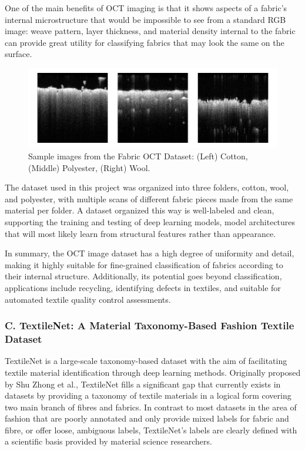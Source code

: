 One of the main benefits of OCT imaging is that it shows aspects of a fabric’s internal microstructure that would be impossible to see from a standard RGB image: weave pattern, layer thickness, and material density internal to the fabric can provide great utility for classifying fabrics that may look the same on the surface. 

\begin{figure}[H]
    \centering
    \begin{minipage}{0.8\linewidth}
        \includegraphics[width=\linewidth]{images/FabricOCTDataset.png}
    \end{minipage}
    \caption[Sample images from the Fabric OCT Dataset]{Sample images from the Fabric OCT Dataset: (Left) Cotton, (Middle) Polyester, (Right) Wool.}
\end{figure}

The dataset used in this project was organized into three folders, cotton, wool, and polyester, with multiple scans of different fabric pieces made from the same material per folder. A dataset organized this way is well-labeled and clean, supporting the training and testing of deep learning models, model architectures that will most likely learn from structural features rather than appearance. 

In summary, the OCT image dataset has a high degree of uniformity and detail, making it highly suitable for fine-grained classification of fabrics according to their internal structure. Additionally, its potential goes beyond classification, applications include recycling, identifying defects in textiles, and suitable for automated textile quality control assessments.

\subsubsection{C. TextileNet: A Material Taxonomy-Based Fashion Textile Dataset~\cite{zhong2023textilenet}}

TextileNet is a large-scale taxonomy-based dataset with the aim of facilitating textile material identification through deep learning methods. Originally proposed by Shu Zhong et al., TextileNet fills a significant gap that currently exists in datasets by providing a taxonomy of textile materials in a logical form covering two main branch of fibres and fabrics. In contrast to most datasets in the area of fashion that are poorly annotated and only provide mixed labels for fabric and fibre, or offer loose, ambiguous labels, TextileNet's labels are clearly defined with a scientific basis provided by material science researchers.

